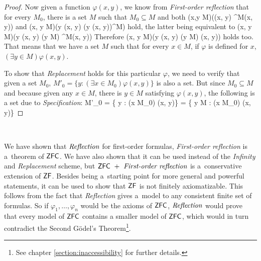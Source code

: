 \begin{proof}
Now given a function $\varphi(x, y)$, we know from \emph{First-order reflection} that for every $M_0$, there is a set $M$ such that $M_0 \subseteq M$ and both
\beq
(\forall x,y \in M)(\varphi(x, y) \iff \varphi^M(x, y))
\eeq 
and
\beq
(\forall x, y \in M)(\exists y \varphi(x, y) \iff (\exists y \varphi(x, y))^M)
\eeq 
hold, the latter being equivalent to 
\beq
(\forall x, y \in M)(\exists y \varphi(x, y) \iff (\exists y \in M) \varphi^M(x, y))
\eeq
Therefore 
\beq
(\forall x, y \in M)(\exists y \varphi(x, y) \iff (\exists y \in M) \varphi(x, y))
\eeq
holds too.
That means that we have a set $M$ such that for every $x \in M$, if $\varphi$ is defined for $x$, $(\exists y \in M) \varphi(x, y)$. 

To show that \emph{Replacement} holds for this particular $\varphi$, we need to verify that given a set $M_0$, $M'_0 = \{ y : (\exists x \in M_0) \varphi(x, y)\}$ is also a set. But since $M_0 \subseteq M$ and because given any $x \in M$, there is $y \in M$ satisfying $\varphi(x, y)$, the following is a set due to \emph{Specification}:
\beq
M'_0 = \{ y : (\exists x \in M_0) \varphi(x, y)\} = \{ y \in M : (\exists x \in M_0) \varphi(x, y)\}
\eeq

\end{proof}

\


We have shown that $\emph{Reflection}$ for first-order formulas, \emph{First-order reflection} is a~theorem of $\sf{ZFC}$.%
We have also shown that it can be used instead of the \emph{Infinity} and \emph{Replacement} scheme, but $\sf{ZFC}\ +\ \emph{First-order reflection}$ is a~conservative extension of $\sf{ZF}$. Besides being a~starting point for more general and powerful statements, it can be used to show that $\sf{ZF}$ is not finitely axiomatizable. This follows from the fact that \emph{Reflection} gives a~model to any consistent finite set of formulas. %
So if $\varphi_1, \ldots, \varphi_n$ would be the axioms of $\sf{ZFC}$, $\emph{Reflection}$ would prove that every model of $\sf{ZFC}$ contains a smaller model of $\sf{ZFC}$, which would in turn contradict the Second Gödel's Theorem\footnote{See chapter \ref{section:inaccessibility} for further details.}.

